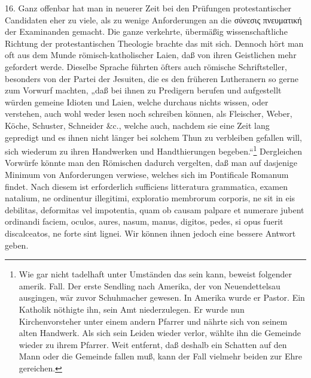 16. Ganz offenbar hat man in neuerer Zeit bei den Prüfungen protestantischer Candidaten eher zu viele, als zu wenige Anforderungen an die σύνεσις πνευματική der Examinanden gemacht. Die ganze verkehrte, übermäßig wissenschaftliche Richtung der protestantischen Theologie brachte das mit sich. Dennoch hört man oft aus dem Munde römisch-katholischer Laien, daß von ihren Geistlichen mehr gefordert werde. Dieselbe Sprache führten öfters auch römische Schriftsteller, besonders von der Partei der Jesuiten, die es den früheren Lutheranern so gerne zum Vorwurf machten, „daß bei ihnen zu Predigern berufen und aufgestellt würden gemeine Idioten und Laien, welche durchaus nichts wissen, oder verstehen, auch wohl weder lesen noch schreiben können, als Fleischer, Weber, Köche, Schuster, Schneider \&c., welche auch, nachdem sie eine Zeit lang gepredigt und es ihnen nicht länger bei solchem Thun zu verbleiben gefallen will, sich wiederum zu ihren Handwerken und Handthierungen begeben.“\footnote{Wie gar nicht tadelhaft unter Umständen das sein kann, beweist folgender amerik. Fall. Der erste Sendling nach Amerika, der von Neuendettelsau ausgingen, wär zuvor Schuhmacher gewesen. In Amerika wurde er Pastor. Ein Katholik nöthigte ihn, sein Amt niederzulegen. Er wurde nun Kirchenvorsteher unter einem andern Pfarrer und nährte sich von seinem alten Handwerk. Als sich sein Leiden wieder verlor, wählte ihn die Gemeinde wieder zu ihrem Pfarrer. Weit entfernt, daß deshalb ein Schatten auf den Mann oder die Gemeinde fallen muß, kann der Fall vielmehr beiden zur Ehre gereichen.} Dergleichen Vorwürfe
könnte man den Römischen dadurch vergelten, daß man auf dasjenige Minimum von Anforderungen verwiese, welches sich im Pontificale Romanum findet. Nach diesem ist erforderlich sufficiens litteratura grammatica, examen natalium, ne ordinentur illegitimi, exploratio membrorum corporis, ne sit in eis debilitas, deformitas vel impotentia, quam ob causam palpare et numerare jubent ordinandi faciem, oculos, aures, nasum, manus, digitos, pedes, si opus fuerit discalceatos, ne forte sint lignei. Wir können ihnen jedoch eine bessere Antwort geben.

